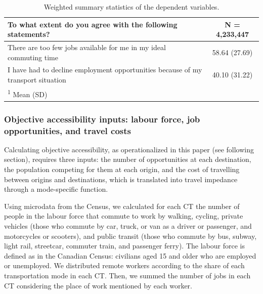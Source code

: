 \documentclass[preprint, 3p,
authoryear]{elsarticle} %
\begin{document}
\begin{table}
\centering
\caption{\label{tab:unnamed-chunk-1}\label{tab:out-description}Weighted summary statistics of the dependent variables.}
\centering
\fontsize{10}{12}\selectfont
\begin{tabular}[t]{lc}
\toprule
To what extent do you agree with the following statements? & \textbf{N = 4,233,447}\\
\midrule
There are too few jobs available for me in my ideal commuting time & 58.64 (27.69)\\
I have had to decline employment opportunities because of my transport situation & 40.10 (31.22)\\
\bottomrule
\multicolumn{2}{l}{\rule{0pt}{1em}\textsuperscript{1} Mean (SD)}\\
\end{tabular}
\end{table}

\subsubsection{Objective accessibility inputs: labour force, job
opportunities, and travel
costs}\label{objective-accessibility-inputs-labour-force-job-opportunities-and-travel-costs}

Calculating objective accessibility, as operationalized in this paper
(see following section), requires three inputs: the number of
opportunities at each destination, the population competing for them at
each origin, and the cost of travelling between origins and
destinations, which is translated into travel impedance through a
mode-specific function.

Using microdata from the Census, we calculated for each CT the number of
people in the labour force that commute to work by walking, cycling,
private vehicles (those who commute by car, truck, or van as a driver or
passenger, and motorcycles or scooters), and public transit (those who
commute by bus, subway, light rail, streetcar, commuter train, and
passenger ferry). The labour force is defined as in the Canadian Census:
civilians aged 15 and older who are employed or unemployed. We
distributed remote workers according to the share of each transportation
mode in each CT. Then, we summed the number of jobs in each CT
considering the place of work mentioned by each worker.
\end{document}
